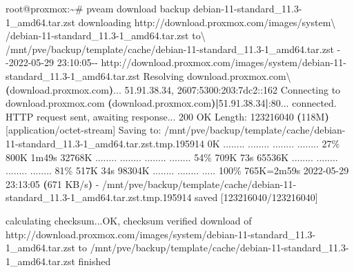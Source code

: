 \documentclass[
  10pt,
]{krantz}
\newenvironment{Shaded}{\begin{snugshade}}{\end{snugshade}}
\newcommand{\DataTypeTok}[1]{\textcolor[rgb]{0.13,0.29,0.53}{#1}}
\newcommand{\ErrorTok}[1]{\textcolor[rgb]{0.64,0.00,0.00}{\textbf{#1}}}
\newcommand{\ExtensionTok}[1]{#1}
\newcommand{\KeywordTok}[1]{\textcolor[rgb]{0.13,0.29,0.53}{\textbf{#1}}}
\newcommand{\NormalTok}[1]{#1}
\newcommand{\StringTok}[1]{\textcolor[rgb]{0.31,0.60,0.02}{#1}}
\begin{document}
\begin{Shaded}
\begin{Highlighting}[]
\ExtensionTok{root@proxmox:\textasciitilde{}\#}\NormalTok{ pveam download backup debian{-}11{-}standard\_11.3{-}1\_amd64.tar.zst}
\ExtensionTok{downloading}\NormalTok{ http://download.proxmox.com/images/system}\DataTypeTok{\textbackslash{}}
\NormalTok{/debian{-}11{-}standard\_11.3{-}1\_amd64.tar.zst to}\DataTypeTok{\textbackslash{}}
\NormalTok{/mnt/pve/backup/template/cache/debian{-}11{-}standard\_11.3{-}1\_amd64.tar.zst}
\ExtensionTok{{-}{-}2022{-}05{-}29}\NormalTok{ 23:10:05{-}{-}  }
\ExtensionTok{http://download.proxmox.com/images/system/debian{-}11{-}standard\_11.3{-}1\_amd64.tar.zst}
\ExtensionTok{Resolving}\NormalTok{ download.proxmox.com}\DataTypeTok{\textbackslash{}}
\ErrorTok{(}\ExtensionTok{download.proxmox.com}\KeywordTok{)}\ExtensionTok{...}\NormalTok{ 51.91.38.34, 2607:5300:203:7dc2::162}
\ExtensionTok{Connecting}\NormalTok{ to download.proxmox.com }\ErrorTok{(}\ExtensionTok{download.proxmox.com}\KeywordTok{)|}\ExtensionTok{51.91.38.34}\KeywordTok{|}\ExtensionTok{:80...}
\ExtensionTok{connected.}
\ExtensionTok{HTTP}\NormalTok{ request sent, awaiting response... 200 OK}
\ExtensionTok{Length:}\NormalTok{ 123216040 }\ErrorTok{(}\ExtensionTok{118M}\KeywordTok{)} \ExtensionTok{[application/octet{-}stream]}
\ExtensionTok{Saving}\NormalTok{ to:}
\StringTok{\textquotesingle{}/mnt/pve/backup/template/cache/debian{-}11{-}standard\_11.3{-}1\_amd64.tar.zst.tmp.195914\textquotesingle{}}
     \ExtensionTok{0K}\NormalTok{ ........ ........ ........ ........ 27\%  800K 1m49s}
 \ExtensionTok{32768K}\NormalTok{ ........ ........ ........ ........ 54\%  709K 73s}
 \ExtensionTok{65536K}\NormalTok{ ........ ........ ........ ........ 81\%  517K 34s}
 \ExtensionTok{98304K}\NormalTok{ ........ ........ .....            100\%  765K=2m59s}
\ExtensionTok{2022{-}05{-}29}\NormalTok{ 23:13:05 }\ErrorTok{(}\ExtensionTok{671}\NormalTok{ KB/s}\KeywordTok{)} \ExtensionTok{{-}}
\StringTok{\textquotesingle{}/mnt/pve/backup/template/cache/debian{-}11{-}standard\_11.3{-}1\_amd64.tar.zst.tmp.195914\textquotesingle{}}
\ExtensionTok{saved}\NormalTok{ [123216040/123216040]}

\ExtensionTok{calculating}\NormalTok{ checksum...OK, checksum verified}
\ExtensionTok{download}\NormalTok{ of}
\StringTok{\textquotesingle{}http://download.proxmox.com/images/system/debian{-}11{-}standard\_11.3{-}1\_amd64.tar.zst\textquotesingle{}}
\ExtensionTok{to} 
\StringTok{\textquotesingle{}/mnt/pve/backup/template/cache/debian{-}11{-}standard\_11.3{-}1\_amd64.tar.zst\textquotesingle{}}\NormalTok{ finished}
\end{Highlighting}
\end{Shaded}
\end{document}
